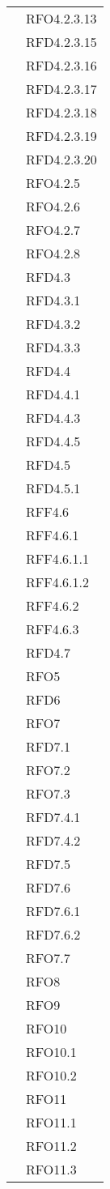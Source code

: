 \begin{longtable}{|>{\centering}m{10cm}|m{3cm}<{\centering}|}
& RFO4.2.3.13\\
& RFD4.2.3.15\\
& RFD4.2.3.16\\
& RFD4.2.3.17\\
& RFD4.2.3.18\\
& RFD4.2.3.19\\
& RFD4.2.3.20\\
& RFO4.2.5\\
& RFO4.2.6\\
& RFO4.2.7\\
& RFO4.2.8\\
& RFD4.3\\
& RFD4.3.1\\
& RFD4.3.2\\
& RFD4.3.3\\
& RFD4.4\\
& RFD4.4.1\\
& RFD4.4.3\\
& RFD4.4.5\\
& RFD4.5\\
& RFD4.5.1\\
& RFF4.6\\
& RFF4.6.1\\
& RFF4.6.1.1\\
& RFF4.6.1.2\\
& RFF4.6.2\\
& RFF4.6.3\\
& RFD4.7\\
& RFO5\\
& RFD6\\
& RFO7\\
& RFD7.1\\
& RFO7.2\\
& RFO7.3\\
& RFD7.4.1\\
& RFD7.4.2\\
& RFD7.5\\
& RFD7.6\\
& RFD7.6.1\\
& RFD7.6.2\\
& RFO7.7\\
& RFO8\\
& RFO9\\
& RFO10\\
& RFO10.1\\
& RFO10.2\\
& RFO11\\
& RFO11.1\\
& RFO11.2\\
& RFO11.3\\

\end{longtable}

